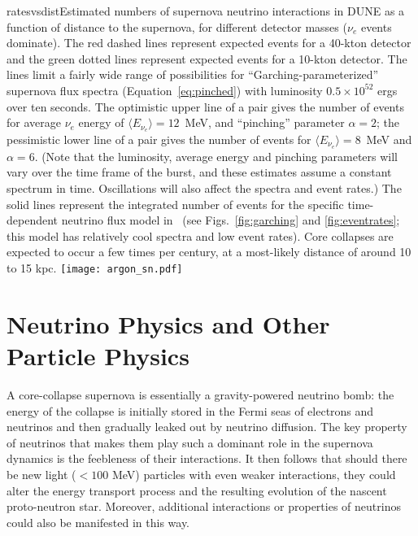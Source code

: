 \begin{dunefigure}{ratesvsdist}{Estimated numbers of supernova neutrino interactions in DUNE as a function of distance to the supernova, for different detector masses ($\nu_e$ events dominate). The red dashed lines represent expected events for a 40-kton detector and the green dotted lines represent expected events for a 10-kton detector. The lines limit a fairly wide range of possibilities for ``Garching-parameterized'' supernova flux spectra (Equation~\ref{eq:pinched}) with luminosity $0.5\times 10^{52}$ ergs over ten seconds. The optimistic upper line of a pair gives the number of events for average $\nu_e$ energy of $\langle E_{\nu_e}\rangle =12$~MeV, and ``pinching'' parameter $\alpha=2$; the pessimistic lower line of a pair gives the number of events for $\langle E_{\nu_e}\rangle=8$~MeV and $\alpha=6$. (Note that the luminosity, average energy and pinching parameters will vary over the time frame of the burst, and these estimates assume a constant spectrum in time. Oscillations will also affect the spectra and event rates.) The solid lines represent the integrated number of events for the specific time-dependent neutrino flux model in~\cite{Huedepohl:2009wh} (see Figs.~\ref{fig:garching} and \ref{fig:eventrates}; this model has relatively cool spectra and low event rates). Core collapses are expected to occur a few times per century, at a most-likely distance of around 10 to 15 kpc.}
\texttt{[image: argon\_sn.pdf]}
\end{dunefigure}


\section{Neutrino Physics and Other Particle Physics}
\label{sec:physics-snblowe-neutrino-physics}

A core-collapse supernova is essentially a gravity-powered neutrino bomb: the energy of the collapse is initially stored in the Fermi seas of electrons and neutrinos and then gradually leaked out by neutrino diffusion. The key property of neutrinos that makes them play such a dominant role in the supernova dynamics is the feebleness of their interactions. It then follows that should there be new light ($< 100$ MeV) particles with even weaker interactions, they could alter the energy transport process and the resulting evolution of the nascent proto-neutron star. Moreover, additional interactions or properties of neutrinos could also be manifested in this way. 

